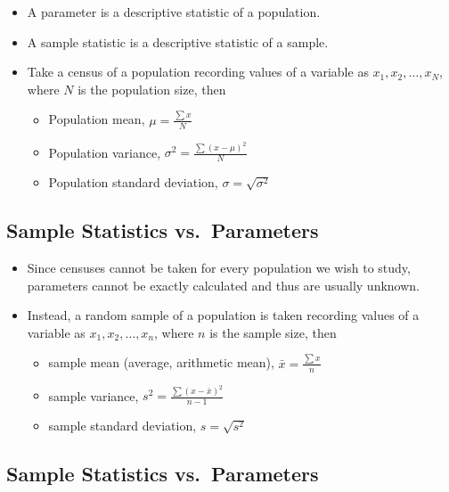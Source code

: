 \documentclass[
  letterpaper,
  DIV=11,
  numbers=noendperiod]{scrartcl}
\begin{document}
\begin{itemize}
\item
  A {parameter} is a descriptive statistic of a population.
\item
  A {sample statistic} is a descriptive statistic of a sample.
\item
  Take a {census} of a population recording values of a variable as
  \(x_1, x_2,\ldots,x_N\), where \(N\) is the population size, then

  \begin{itemize}
  \item
    Population mean, \(\mu=\frac{\textstyle\sum x}{N}\)
  \item
    Population variance, \(\sigma^2=\frac{\textstyle\sum (x-\mu)^2}{N}\)
  \item
    Population standard deviation, \(\sigma=\sqrt{\sigma^2}\)
  \end{itemize}
\end{itemize}

\subsection{Sample Statistics
vs.~Parameters}\label{sample-statistics-vs.-parameters-1}

\begin{itemize}
\item
  Since censuses cannot be taken for every population we wish to study,
  parameters cannot be exactly calculated and thus are usually unknown.
\item
  Instead, a {random sample} of a population is taken recording values
  of a variable as \(x_1, x_2,\ldots,x_n\), where \(n\) is the sample
  size, then

  \begin{itemize}
  \item
    sample mean (average, arithmetic mean),
    \(\bar{x}= \frac{\textstyle \sum x}{n}\)
  \item
    sample variance, \(s^2=\frac{\textstyle \sum (x-\bar{x})^2}{n-1}\)
  \item
    sample standard deviation, \(s=\sqrt{s^2}\)
  \end{itemize}
\end{itemize}

\subsection{Sample Statistics
vs.~Parameters}\label{sample-statistics-vs.-parameters-2}
\end{document}
